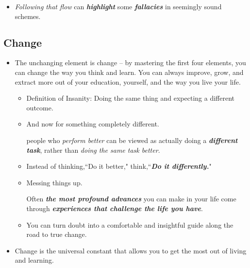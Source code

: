 \documentclass[11pt]{article}
\begin{document}
\begin{itemize}
\begin{itemize}
\item \emph{Following that flow} can \emph{\textbf{highlight}} some \emph{\textbf{fallacies}} in seemingly sound schemes.
\end{itemize}
\end{itemize}


\subsection{Change}
\begin{itemize}
\item The unchanging element is change -- by mastering the first four elements, you can change the way you think and learn. You can always improve, grow, and extract more out of your education, yourself, and the way you live your life. 
\begin{itemize}
\item Definition of Insanity: Doing the same thing and expecting a different outcome.

\item And now for something completely different.

people who \emph{perform better} can be viewed as actually doing a \emph{\textbf{different task}}, rather than \emph{doing the same task better}.

\item Instead of thinking,``Do it better," think,``\emph{\textbf{Do it differently.}}"

\item Messing things up. 

Often \emph{\textbf{the most profound advances}} you can make in your life come through \emph{\textbf{experiences that challenge the life you have}}. 

\item You can turn doubt into a comfortable and insightful guide along the road to true change.
\end{itemize}

\item Change is the universal constant that allows you to get the most out of living and learning.
\end{itemize}



\newpage
\end{document}
